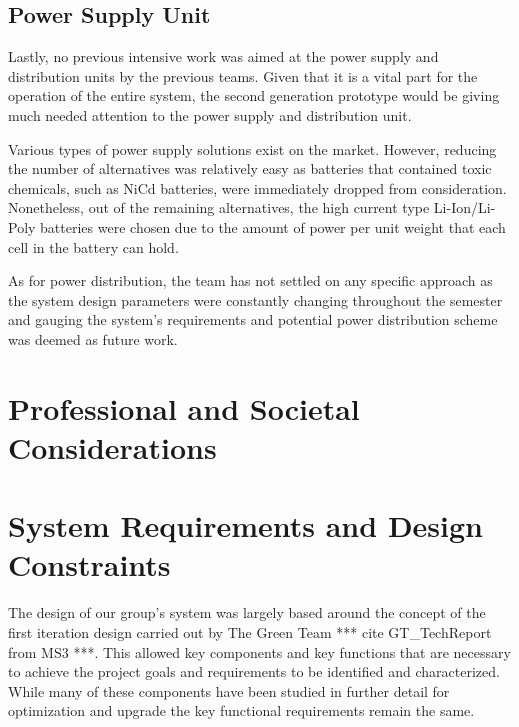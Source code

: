 \subsection{Power Supply Unit}

\indent\indent Lastly, no previous intensive work was aimed at the power supply and distribution units by the previous teams. Given that it is a vital part for the operation of the entire system, the second generation prototype would be giving much needed attention to the power supply and distribution unit.

\indent Various types of power supply solutions exist on the market. However, reducing the number of alternatives was relatively easy as batteries that contained toxic chemicals, such as NiCd batteries, were immediately dropped from consideration. Nonetheless, out of the remaining alternatives, the high current type Li-Ion/Li-Poly batteries were chosen due to the amount of power per unit weight that each cell in the battery can hold.

\indent As for power distribution, the team has not settled on any specific approach as the system design parameters were constantly changing throughout the semester and gauging the system’s requirements and potential power distribution scheme was deemed as future work.


\section{Professional and Societal Considerations}


\section{\label{sys_reqs}System Requirements and Design Constraints}

\indent\indent The design of our group's system was largely based around the concept of the first iteration design carried out by The Green Team *** cite GT\_TechReport from MS3 ***. This allowed key components and key functions that are necessary to achieve the project goals and requirements to be identified and characterized. While many of these components have been studied in further detail for optimization and upgrade the key functional requirements remain the same.

